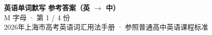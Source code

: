 \documentclass[10pt,a4paper]{article}
\begin{document}
\pagestyle{plain}

\begin{center}
{\LARGE\bfseries 英语单词默写 \quad 参考答案（英 $\to$ 中）}\\[0.22em]
{\large M 字母 · 第 1 / 4 份}\\[0.18em]
{\small 2026年上海市高考英语词汇用法手册 · 参照普通高中英语课程标准}
\end{center}

\vspace{0.2em}
\noindent{\color{rulegray}\rule{\textwidth}{0.8pt}}

\vspace{0.35em}

\vspace{0.25em}
\renewcommand{\arraystretch}{1.32}
\end{document}
